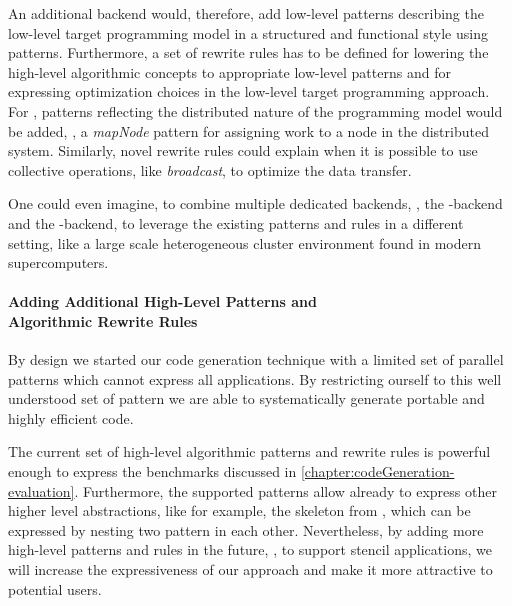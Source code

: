 An additional backend would, therefore, add low-level patterns describing the low-level target programming model in a structured and functional style using patterns.
Furthermore, a set of rewrite rules has to be defined for lowering the high-level algorithmic concepts to appropriate low-level patterns and for expressing optimization choices in the low-level target programming approach.
For \MPI, patterns reflecting the distributed nature of the programming model would be added, \eg, a \emph{mapNode} pattern for assigning work to a node in the distributed system.
Similarly, novel rewrite rules could explain when it is possible to use collective operations, like \emph{broadcast}, to optimize the data transfer.

One could even imagine, to combine multiple dedicated backends, \eg, the \MPI-backend and the \OpenCL-backend, to leverage the existing patterns and rules in a different setting, like a large scale heterogeneous cluster environment found in modern supercomputers.

\paragraph{Adding Additional High-Level Patterns and\\ Algorithmic Rewrite Rules}
By design we started our code generation technique with a limited set of parallel patterns which cannot express all applications.
By restricting ourself to this well understood set of pattern we are able to systematically generate portable and highly efficient code.

The current set of high-level algorithmic patterns and rewrite rules is powerful enough to express the benchmarks discussed in \autoref{chapter:codeGeneration-evaluation}.
Furthermore, the supported patterns allow already to express other higher level abstractions, like for example, the \allpairs skeleton from \SkelCL, which can be expressed by nesting two \map pattern in each other.
Nevertheless, by adding more high-level patterns and rules in the future, \eg, to support stencil applications, we will increase the expressiveness of our approach and make it more attractive to potential users.

